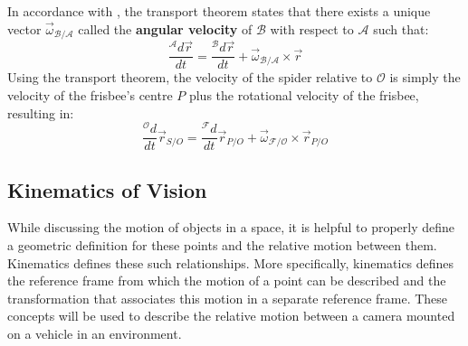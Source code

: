 \documentclass{UoNMCHA}
\numberwithin{equation}{section}
\begin{document}
In accordance with \cite{3900Notes}, the transport theorem states that there exists a unique vector $\vec{\omega}_{\mathcal{B}/\mathcal{A}}$ called the \textbf{angular velocity} of $\mathbf{\mathcal{B}}$ with respect to $\mathbf{\mathcal{A}}$ such that:
\begin{equation}\label{eq:transportTheorem}
	\frac{{}^\mathcal{A}d\vec{r}}{dt} = \frac{{}^\mathcal{B}d\vec{r}}{dt} + \vec{\omega}_{\mathcal{B}/\mathcal{A}}\times\vec{r}
\end{equation}
Using the transport theorem, the velocity of the spider relative to $\mathcal{O}$ is simply the velocity of the frisbee's centre $P$ plus the rotational velocity of the frisbee, resulting in:
\begin{equation}
	\frac{{}^\mathcal{O}d}{dt}\vec{r}_{S/O} = \frac{{}^\mathcal{F}d}{dt}\vec{r}_{P/O} + \vec{\omega}_{\mathcal{F}/\mathcal{O}}\times\vec{r}_{P/O}
\end{equation}

\subsection{Kinematics of Vision}
While discussing the motion of objects in a space, it is helpful to properly define a geometric definition for these points and the relative motion between them. Kinematics defines these such relationships. More specifically, kinematics defines the reference frame from which the motion of a point can be described and the transformation that associates this motion in a separate reference frame. These concepts will be used to describe the relative motion between a camera mounted on a vehicle in an environment.
\end{document}
